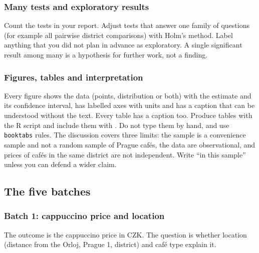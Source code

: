 \documentclass[11pt,a4paper]{article}
\begin{document}
\subsubsection*{Many tests and exploratory results}

Count the tests in your report. Adjust tests that answer one family of questions (for example all pairwise district comparisons) with Holm's method. Label anything that you did not plan in advance as exploratory. A single significant result among many is a hypothesis for further work, not a finding.

\subsubsection*{Figures, tables and interpretation}

Every figure shows the data (points, distribution or both) with the estimate and its confidence interval, has labelled axes with units and has a caption that can be understood without the text. Every table has a caption too. Produce tables with the R script and include them with \verb||. Do not type them by hand, and use \texttt{booktabs} rules. The discussion covers three limits: the sample is a convenience sample and not a random sample of Prague caf\'es, the data are observational, and prices of caf\'es in the same district are not independent. Write ``in this sample'' unless you can defend a wider claim.

\clearpage
\subsection{The five batches}\label{sec:batches}

\subsubsection{Batch 1: cappuccino price and location}

The outcome is the cappuccino price in CZK. The question is whether location (distance from the Orloj, Prague 1, district) and caf\'e type explain it.
\end{document}
